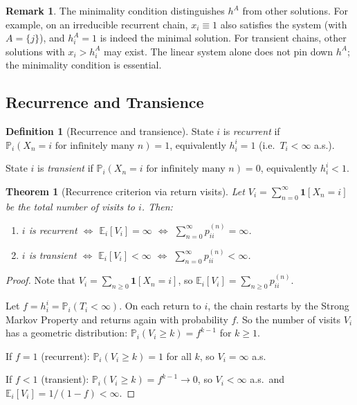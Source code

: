 \documentclass[12pt, a4paper]{article}
\theoremstyle{definition}
\newtheorem{definition}{Definition}[section]
\newtheorem{remark}{Remark}[section]
\theoremstyle{plain}
\newtheorem{theorem}{Theorem}[section]
\newcommand{\PP}{\mathbb{P}}
\newcommand{\EE}{\mathbb{E}}
\begin{document}
\begin{remark}
The minimality condition distinguishes $h^A$ from other solutions. For example, on an irreducible recurrent chain, $x_i \equiv 1$ also satisfies the system (with $A = \{j\}$), and $h^A_i = 1$ is indeed the minimal solution. For transient chains, other solutions with $x_i > h^A_i$ may exist. The linear system alone does not pin down $h^A$; the minimality condition is essential.
\end{remark}

\subsection{Recurrence and Transience}

\begin{definition}[Recurrence and transience]
State $i$ is \emph{recurrent} if $\PP_i(X_n = i \text{ for infinitely many } n) = 1$, equivalently $h_i^i = 1$ (i.e.\ $T_i < \infty$ a.s.).

State $i$ is \emph{transient} if $\PP_i(X_n = i \text{ for infinitely many } n) = 0$, equivalently $h_i^i < 1$.
\end{definition}

\begin{theorem}[Recurrence criterion via return visits]
Let $V_i = \sum_{n=0}^{\infty} \mathbf{1}[X_n = i]$ be the total number of visits to $i$. Then:
\begin{enumerate}[label=(\roman*)]
  \item $i$ is recurrent $\iff$ $\EE_i[V_i] = \infty$ $\iff$ $\sum_{n=0}^{\infty} p_{ii}^{(n)} = \infty$.
  \item $i$ is transient $\iff$ $\EE_i[V_i] < \infty$ $\iff$ $\sum_{n=0}^{\infty} p_{ii}^{(n)} < \infty$.
\end{enumerate}
\end{theorem}

\begin{proof}
Note that $V_i = \sum_{n \ge 0} \mathbf{1}[X_n = i]$, so $\EE_i[V_i] = \sum_{n \ge 0} p_{ii}^{(n)}$.

Let $f = h_i^i = \PP_i(T_i < \infty)$. On each return to $i$, the chain restarts by the Strong Markov Property and returns again with probability $f$. So the number of visits $V_i$ has a geometric distribution: $\PP_i(V_i \ge k) = f^{k-1}$ for $k \ge 1$.

If $f = 1$ (recurrent): $\PP_i(V_i \ge k) = 1$ for all $k$, so $V_i = \infty$ a.s.

If $f < 1$ (transient): $\PP_i(V_i \ge k) = f^{k-1} \to 0$, so $V_i < \infty$ a.s.\ and $\EE_i[V_i] = 1/(1-f) < \infty$.
\end{proof}
\end{document}
